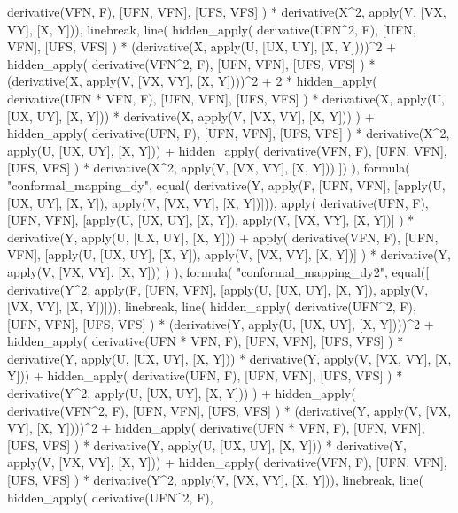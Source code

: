 \begin{prolog}
						derivative(VFN, F),
						[UFN, VFN],
						[UFS, VFS]
					) * derivative(X^2, apply(V, [VX, VY], [X, Y])),
					linebreak,
					line(
						hidden_apply(
							derivative(UFN^2, F),
							[UFN, VFN],
							[UFS, VFS]
						) * (derivative(X, apply(U, [UX, UY], [X, Y])))^2 +
						hidden_apply(
							derivative(VFN^2, F),
							[UFN, VFN],
							[UFS, VFS]
						) * (derivative(X, apply(V, [VX, VY], [X, Y])))^2 +
						2 * hidden_apply(
							derivative(UFN * VFN, F),
							[UFN, VFN],
							[UFS, VFS]
						) * derivative(X, apply(U, [UX, UY], [X, Y])) * derivative(X, apply(V, [VX, VY], [X, Y]))
					) +
					hidden_apply(
						derivative(UFN, F),
						[UFN, VFN],
						[UFS, VFS]
					) * derivative(X^2, apply(U, [UX, UY], [X, Y])) +					
					hidden_apply(
						derivative(VFN, F),
						[UFN, VFN],
						[UFS, VFS]
					) * derivative(X^2, apply(V, [VX, VY], [X, Y]))
				])
			),
			formula(
				"conformal_mapping_dy",
				equal(
					derivative(Y, apply(F, [UFN, VFN], [apply(U, [UX, UY], [X, Y]), apply(V, [VX, VY], [X, Y])])),
					apply(
						derivative(UFN, F),
						[UFN, VFN], [apply(U, [UX, UY], [X, Y]), apply(V, [VX, VY], [X, Y])]
					) * derivative(Y, apply(U, [UX, UY], [X, Y])) +
					apply(
						derivative(VFN, F),
						[UFN, VFN], [apply(U, [UX, UY], [X, Y]), apply(V, [VX, VY], [X, Y])]
					) * derivative(Y, apply(V, [VX, VY], [X, Y]))
				)
			),
			formula(
				"conformal_mapping_dy2",
				equal([
					derivative(Y^2, apply(F, [UFN, VFN], [apply(U, [UX, UY], [X, Y]), apply(V, [VX, VY], [X, Y])])),
					linebreak,
					line(
						hidden_apply(
							derivative(UFN^2, F),
							[UFN, VFN],
							[UFS, VFS]
						) * (derivative(Y, apply(U, [UX, UY], [X, Y])))^2 +
						hidden_apply(
							derivative(UFN * VFN, F),
							[UFN, VFN],
							[UFS, VFS]
						) * derivative(Y, apply(U, [UX, UY], [X, Y])) * derivative(Y, apply(V, [VX, VY], [X, Y])) +
						hidden_apply(
							derivative(UFN, F),
							[UFN, VFN],
							[UFS, VFS]
						) * derivative(Y^2, apply(U, [UX, UY], [X, Y]))
					) +
					hidden_apply(
						derivative(VFN^2, F),
						[UFN, VFN],
						[UFS, VFS]
					) * (derivative(Y, apply(V, [VX, VY], [X, Y])))^2 +
					hidden_apply(
						derivative(UFN * VFN, F),
						[UFN, VFN],
						[UFS, VFS]
					) * derivative(Y, apply(U, [UX, UY], [X, Y])) * derivative(Y, apply(V, [VX, VY], [X, Y])) +
					hidden_apply(
						derivative(VFN, F),
						[UFN, VFN],
						[UFS, VFS]
					) * derivative(Y^2, apply(V, [VX, VY], [X, Y])),
					linebreak,
					line(
						hidden_apply(
							derivative(UFN^2, F),

\end{prolog}
